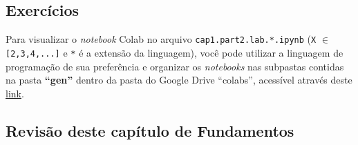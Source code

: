 \documentclass[12pt,a4paper]{article}
\begin{document}
    \hypertarget{exercuxedcios}{%
\subsection{Exercícios}\label{exercuxedcios}}

    Para visualizar o \emph{notebook} Colab no arquivo
\texttt{cap1.part2.lab.*.ipynb} (\texttt{X} \(\in\)
\texttt{{[}2,3,4,...{]}} e \texttt{*} é a extensão da linguagem), você
pode utilizar a linguagem de programação de sua preferência e organizar
os \emph{notebooks} nas subpastas contidas na pasta \textbf{``gen''}
dentro da pasta do Google Drive ``colabs'', acessível através deste
\href{https://drive.google.com/drive/folders/1YlFwv8XYN7PYYf-HwDMlkxzbmXzJw9cM?usp=sharing}{link}.

    \hypertarget{revisuxe3o-deste-capuxedtulo-de-fundamentos}{%
\subsection{Revisão deste capítulo de
Fundamentos}\label{revisuxe3o-deste-capuxedtulo-de-fundamentos}}
\end{document}
